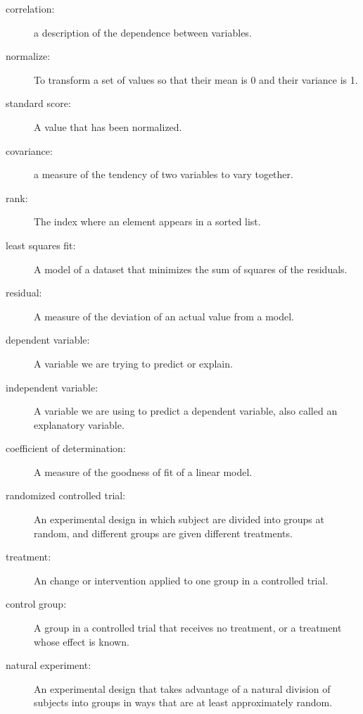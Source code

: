 \documentclass[12pt]{book}
\begin{document}
\begin{description}

\item[correlation:] a description of the dependence between variables.

\item[normalize:] To transform a set of values so that their mean is 0 and
their variance is 1.

\item[standard score:] A value that has been normalized.

\item[covariance:] a measure of the tendency of two variables
to vary together.

\item[rank:] The index where an element appears in a sorted list.

\item[least squares fit:] A model of a dataset that minimizes the
sum of squares of the residuals.

\item[residual:] A measure of the deviation of an actual value from a model.

\item[dependent variable:] A variable we are trying to predict or explain.

\item[independent variable:] A variable we are using to predict a dependent
variable, also called an explanatory variable.

\item[coefficient of determination:] A measure of the goodness of fit
of a linear model.

\item[randomized controlled trial:] An experimental design in which subject
are divided into groups at random, and different groups are given different
treatments.

\item[treatment:] An change or intervention applied to one group in a
controlled trial.

\item[control group:] A group in a controlled trial that receives no
treatment, or a treatment whose effect is known.

\item[natural experiment:] An experimental design that takes advantage of
a natural division of subjects into groups in ways that are at least
approximately random.

\end{description}


\printindex

\clearemptydoublepage
\end{document}
